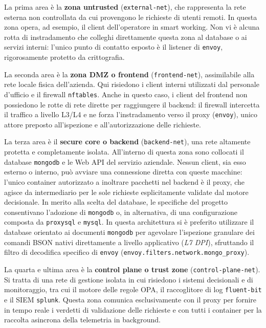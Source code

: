 La prima area è la \textbf{zona untrusted} (\texttt{external-net}), che rappresenta la rete esterna non controllata da cui provengono le richieste di utenti remoti. In questa zona opera, ad esempio, il client dell'operatore in smart working. Non vi è alcuna rotta di instradamento che colleghi direttamente questa zona al database o ai servizi interni: l'unico punto di contatto esposto è il listener di \texttt{envoy}, rigorosamente protetto da crittografia.

La seconda area è la \textbf{zona DMZ o frontend} (\texttt{frontend-net}), assimilabile alla rete locale fisica dell'azienda. Qui risiedono i client interni utilizzati dal personale d'ufficio e il firewall \texttt{nftables}. Anche in questo caso, i client del frontend non possiedono le rotte di rete dirette per raggiungere il backend: il firewall intercetta il traffico a livello L3/L4 e ne forza l'instradamento verso il proxy (\texttt{envoy}), unico attore preposto all'ispezione e all'autorizzazione delle richieste.

La terza area è il \textbf{secure core o backend} (\texttt{backend-net}), una rete altamente protetta e completamente isolata. All'interno di questa zona sono collocati il database \texttt{mongodb} e le Web API del servizio aziendale. Nessun client, sia esso esterno o interno, può avviare una connessione diretta con queste macchine: l'unico container autorizzato a inoltrare pacchetti nel backend è il proxy, che agisce da intermediario per le sole richieste esplicitamente validate dal motore decisionale. In merito alla scelta del database, le specifiche del progetto consentivano l'adozione di \texttt{mongodb} o, in alternativa, di una configurazione composta da \texttt{proxysql} e \texttt{mysql}. In questa architettura si è preferito utilizzare il database orientato ai documenti \texttt{mongodb} per agevolare l'ispezione granulare dei comandi BSON nativi direttamente a livello applicativo (\textit{L7 DPI}), sfruttando il filtro di decodifica specifico di \texttt{envoy} (\texttt{envoy.filters.network.mongo\_proxy}).

La quarta e ultima area è la \textbf{control plane o trust zone} (\texttt{control-plane-net}). Si tratta di una rete di gestione isolata in cui risiedono i sistemi decisionali e di monitoraggio, tra cui il motore delle regole OPA, il raccoglitore di log \texttt{fluent-bit} e il SIEM \texttt{splunk}. Questa zona comunica esclusivamente con il proxy per fornire in tempo reale i verdetti di validazione delle richieste e con tutti i container per la raccolta asincrona della telemetria in background.


